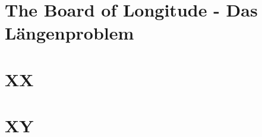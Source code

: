 \begin{refsection}
\section{The Board of Longitude - Das Längenproblem}





\section{XX}




\section{XY}




\printbibliography[heading=subbibliography]
\end{refsection}



